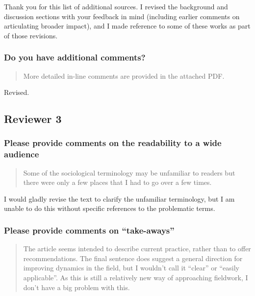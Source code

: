 \documentclass[
]{article}
\begin{document}
Thank you for this list of additional sources. I revised the background
and discussion sections with your feedback in mind (including earlier
comments on articulating broader impact), and I made reference to some
of these works as part of those revisions.

\subsubsection{Do you have additional
comments?}\label{do-you-have-additional-comments-1}

\begin{quote}
More detailed in-line comments are provided in the attached PDF.
\end{quote}

Revised.

\subsection{Reviewer 3}\label{reviewer-3}

\subsubsection{Please provide comments on the readability to a wide
audience}\label{please-provide-comments-on-the-readability-to-a-wide-audience-1}

\begin{quote}
Some of the sociological terminology may be unfamiliar to readers but
there were only a few places that I had to go over a few times.
\end{quote}

I would gladly revise the text to clarify the unfamiliar terminology,
but I am unable to do this without specific references to the
problematic terms.

\subsubsection{Please provide comments on
``take-aways''}\label{please-provide-comments-on-take-aways-2}

\begin{quote}
The article seems intended to describe current practice, rather than to
offer recommendations. The final sentence does suggest a general
direction for improving dynamics in the field, but I wouldn't call it
``clear'' or ``easily applicable''. As this is still a relatively new
way of approaching fieldwork, I don't have a big problem with this.
\end{quote}
\end{document}
